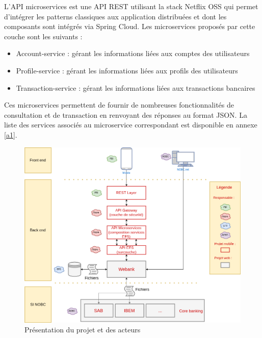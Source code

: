 	L'API microservices est une API REST utilisant la stack Netflix OSS qui permet d'intégrer les patterns classiques aux application distribuées et dont les composants sont intégrés via Spring Cloud. Les microservices proposés par cette couche sont les suivants :\\

\begin{itemize}
			\item Account-service : gérant les informations liées aux comptes des utilisateurs
			\item Profile-service : gérant les informations liées aux profils des utilisateurs
			\item Transaction-service : gérant les informations liées aux transactions bancaires \\
\end{itemize}

	Ces microservices permettent de fournir de nombreuses fonctionnalités de consultation et de transaction en renvoyant des réponses au format JSON. La liste des services associés au microservice correspondant est disponible en annexe \ref{a1}.
	
\begin{figure}[H]
\raggedleft
	\includegraphics[scale=0.45]{images/travailNeuflizeOBC/architecture/archiFonc.png}
	\centering
	\caption{Présentation du projet et des acteurs}
	\label{archiFonc}
\end{figure}